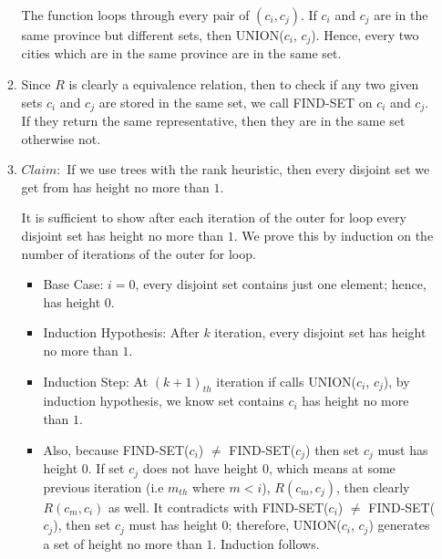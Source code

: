 \documentclass[11pt,twoside]{article}
\begin{document}
\begin{enumerate}[leftmargin=0pt]
\begin{enumerate}
	The function  loops through every pair of $(c_i,c_j)$.   If $c_i$ and $c_j$ are in the same province but different sets, then UNION($c_i$, $c_j$).  Hence, every two cities which are in the same province are in the same set.
\item Since $R$ is clearly a equivalence relation, then to check if any two given sets $c_i$ and $c_j$ are stored in the same set, we call FIND-SET on $c_i$ and $c_j$. If they return the same representative, then they are in the same set otherwise not.
\item
	$Claim:$ If we use trees with the rank heuristic, then every disjoint set we get from  has height no more than $1$. \\
    	  \begin{center}
        \end{center}
        It is sufficient to show after each iteration of the outer for loop every disjoint set has height no more than $1$. We prove this by induction on the number of iterations of the outer for loop. 
	\begin{itemize}[label = {}]
	\item Base Case: $i = 0$, every disjoint set contains just one element; hence, has height $0$. \\
	\item Induction Hypothesis: After  $k$ iteration, every disjoint set has height no more than $1$. \\
	\item Induction Step: At $(k+1)_{th}$ iteration if  calls UNION($c_i$, $c_j$), by induction
	 hypothesis, we know set contains $c_i$  has height no more than $1$.  
	\item Also, because FIND-SET($c_i$) $\neq$ FIND-SET($c_j$) then set $c_j$ must has height $0$. If set $c_j$ does not have height $0$, which means at some previous iteration (i.e $m_{th}$ where $m<i$), $R(c_m, c_j)$, then clearly $R(c_m, c_i)$ as well. It contradicts  with FIND-SET($c_i$) $\neq$ FIND-SET($c_j$), then set $c_j$ must has height $0$; therefore, UNION($c_i$, $c_j$) generates a set of height no more than $1$. Induction follows.

\end{itemize}
\end{enumerate}
\end{enumerate}
\end{document}

